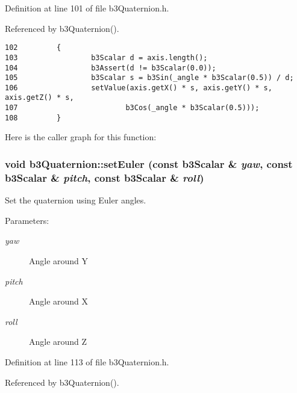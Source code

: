 Definition at line 101 of file b3Quaternion.h.

Referenced by b3Quaternion().

\begin{Code}\begin{verbatim}102         {
103                 b3Scalar d = axis.length();
104                 b3Assert(d != b3Scalar(0.0));
105                 b3Scalar s = b3Sin(_angle * b3Scalar(0.5)) / d;
106                 setValue(axis.getX() * s, axis.getY() * s, axis.getZ() * s, 
107                         b3Cos(_angle * b3Scalar(0.5)));
108         }
\end{verbatim}
\end{Code}




Here is the caller graph for this function:\hypertarget{classb3_quaternion_497ec9be887735d3655eb5f64bfb45bb}{
\subsubsection[setEuler]{\setlength{\rightskip}{0pt plus 5cm}void b3Quaternion::setEuler (const b3Scalar \& {\em yaw}, \/  const b3Scalar \& {\em pitch}, \/  const b3Scalar \& {\em roll})}}
\label{classb3_quaternion_497ec9be887735d3655eb5f64bfb45bb}


Set the quaternion using Euler angles. 

\begin{Desc}
\item[Parameters:]
\begin{description}
\item[{\em yaw}]Angle around Y \item[{\em pitch}]Angle around X \item[{\em roll}]Angle around Z \end{description}
\end{Desc}


Definition at line 113 of file b3Quaternion.h.

Referenced by b3Quaternion().

